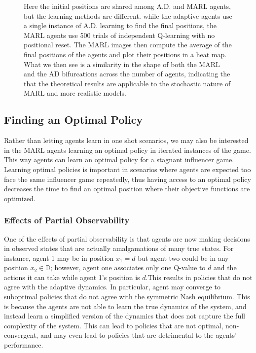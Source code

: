 \documentclass{article}
\newcommand {\D}{\mathbb{D}}
\begin{document}
\begin{figure}[ht!]
                \caption{Here the initial positions are shared among A.D. and MARL agents, but the learning methods are different. while the adaptive agents use a single instance of A.D. learning to find the final positions, the MARL agents use 500 trials of independent Q-learning with no positional reset. The MARL images then compute the average of the final positions of the agents and plot their positions in a heat map. What we then see is a similarity in the shape of both the MARL and the AD bifurcations across the number of agents, indicating the that the theoretical results are applicable to the stochastic nature of MARL and more realistic models.}
                \label{fig11} 
        \end{figure}

        

        
        
        \subsection{Finding an Optimal Policy}
                Rather than letting agents learn in one shot scenarios, we may also be interested in the MARL agents learning an optimal policy in iterated instances of the game. This way agents can learn an optimal policy for a stagnant influencer game. Learning optimal policies is important in scenarios where agents are expected too face the same influencer game repeatedly, thus having access to an optimal policy decreases the time to find an optimal position where their objective functions are optimized.   
            \subsubsection{Effects of Partial Observability}
                One of the effects of partial observability is that agents are now making decisions in observed states that are actually amalgamations of many true states. For instance, agent 1 may be in position $x_1=d$ but agent two could be in any position $x_2\in \D$; 
                however, agent one associates only one Q-value to $d$ and the actions it can take while agent 1's position is $d$.This results in policies that do not agree with the adaptive dynamics. In particular, agent may converge to suboptimal policies that do not agree with the symmetric Nash equilibrium. This is because the agents are not able to learn the true dynamics of the system, and instead learn a simplified version of the dynamics that does not capture the full complexity of the system. This can lead to policies that are not optimal, non-convergent, and may even lead to policies that are detrimental to the agents' performance. 
    
\end{document}
